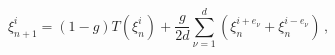 \begin{equation}
\xi^i_{n+1} = (1-g) T\left(\xi^i_n\right) + \frac{g}{2d} \sum_{\nu=1}^d 
              \left(\xi^{i+e_\nu}_n + \xi^{i-e_\nu}_n\right) \, ,
\label{eq22}
\end{equation}

